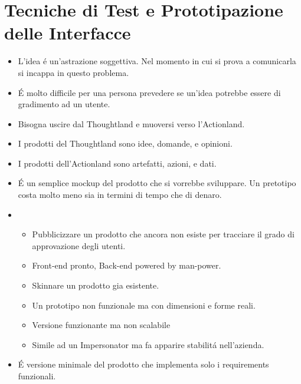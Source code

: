 \chapter{Tecniche di Test e Prototipazione delle Interfacce}

\begin{itemize}
    \item {} L'idea \'e un'astrazione soggettiva. Nel momento in cui si prova a comunicarla si incappa in questo problema.
    \item {} \'E molto difficile per una persona prevedere se un'idea potrebbe essere di gradimento ad un utente.
    \item Bisogna uscire dal Thoughtland e muoversi verso l'Actionland.
    \item I prodotti del Thoughtland sono idee, domande, e opinioni.
    \item I prodotti dell'Actionland sono artefatti, azioni, e dati.
    \item {} \'E un semplice mockup del prodotto che si vorrebbe sviluppare. Un pretotipo costa molto meno sia in termini di tempo che di denaro.
    \item {}
    \begin{itemize}
        \item {} Pubblicizzare un prodotto che ancora non esiste per tracciare il grado di approvazione degli utenti.
        \item {} Front-end pronto, Back-end powered by man-power.
        \item {} Skinnare un prodotto gia esistente.
        \item {} Un prototipo non funzionale ma con dimensioni e forme reali.
        \item {} Versione funzionante ma non scalabile
        \item {} Simile ad un Impersonator ma fa apparire stabilit\'a nell'azienda.
    \end{itemize}
    \item {} \'E versione minimale del prodotto che implementa solo i requirements funzionali.
\end{itemize}